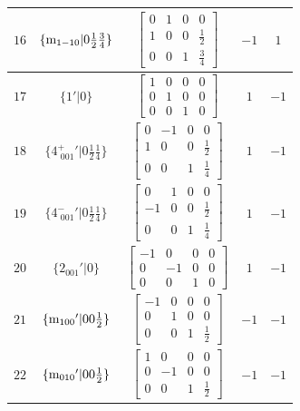 \documentclass[fleqn,8pt]{jsarticle}
\begin{document}
\begin{longtable}{ccccc}
$ 16 $ & $ \{{\rm m}_{1-10}|0 \frac{1}{2} \frac{3}{4}\} $ & $ \begin{bmatrix} 0 & 1 & 0 & 0 \\ 1 & 0 & 0 & \frac{1}{2} \\ 0 & 0 & 1 & \frac{3}{4} \end{bmatrix} $ & $ -1 $ & $ 1 $ \\ \hline
$ 17 $ & $ \{1{}'|0\} $ & $ \begin{bmatrix} 1 & 0 & 0 & 0 \\ 0 & 1 & 0 & 0 \\ 0 & 0 & 1 & 0 \end{bmatrix} $ & $ 1 $ & $ -1 $ \\ \hline
$ 18 $ & $ \{4^{+}_{\,\,001}{}'|0 \frac{1}{2} \frac{1}{4}\} $ & $ \begin{bmatrix} 0 & -1 & 0 & 0 \\ 1 & 0 & 0 & \frac{1}{2} \\ 0 & 0 & 1 & \frac{1}{4} \end{bmatrix} $ & $ 1 $ & $ -1 $ \\ \hline
$ 19 $ & $ \{4^{-}_{\,\,001}{}'|0 \frac{1}{2} \frac{1}{4}\} $ & $ \begin{bmatrix} 0 & 1 & 0 & 0 \\ -1 & 0 & 0 & \frac{1}{2} \\ 0 & 0 & 1 & \frac{1}{4} \end{bmatrix} $ & $ 1 $ & $ -1 $ \\ \hline
$ 20 $ & $ \{2{}_{001}{}'|0\} $ & $ \begin{bmatrix} -1 & 0 & 0 & 0 \\ 0 & -1 & 0 & 0 \\ 0 & 0 & 1 & 0 \end{bmatrix} $ & $ 1 $ & $ -1 $ \\ \hline
$ 21 $ & $ \{{\rm m}_{100}{}'|0 0 \frac{1}{2}\} $ & $ \begin{bmatrix} -1 & 0 & 0 & 0 \\ 0 & 1 & 0 & 0 \\ 0 & 0 & 1 & \frac{1}{2} \end{bmatrix} $ & $ -1 $ & $ -1 $ \\ \hline
$ 22 $ & $ \{{\rm m}_{010}{}'|0 0 \frac{1}{2}\} $ & $ \begin{bmatrix} 1 & 0 & 0 & 0 \\ 0 & -1 & 0 & 0 \\ 0 & 0 & 1 & \frac{1}{2} \end{bmatrix} $ & $ -1 $ & $ -1 $ \\ \hline

\end{longtable}
\end{document}
